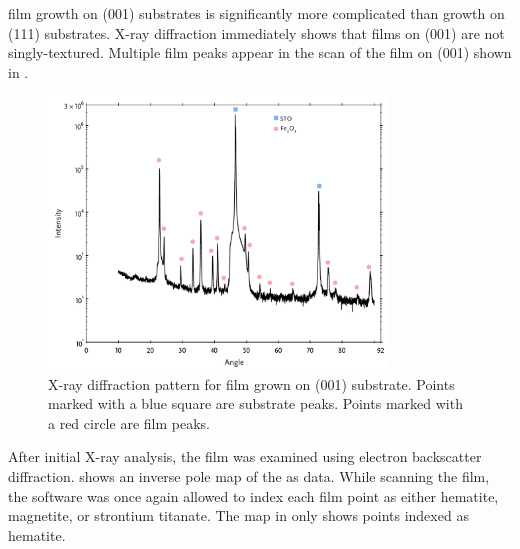  film growth on (001) substrates is significantly more complicated
than growth on (111) substrates. X-ray diffraction immediately shows that films
on (001) are not singly-textured. Multiple film peaks appear in the
\texttheta{} scan of the  film on (001) shown in
. 
\begin{figure}
\centering
	\includegraphics[width=0.8\textwidth]{001xray.pdf}
	\caption[ pattern for  film on ]{%
		X-ray diffraction pattern for  film grown on 
		 (001) substrate. Points marked with a blue 
		square are substrate peaks. Points marked with a red 
		circle are film peaks.}
	\label{fig:001xray}
\end{figure}
After initial X-ray analysis, the film was examined using electron backscatter
diffraction.  shows an inverse pole map of the as  data. While
scanning the film, the  software was once again allowed to index each film point as
either hematite, magnetite, or strontium titanate. The map in  only
shows points indexed as hematite. 

